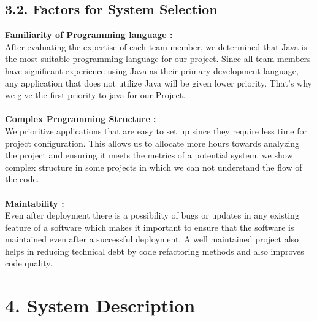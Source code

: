 \documentclass[12pt,letterpaper]{report}
\begin{document}
\subsection*{3.2. Factors for System Selection}
\normalsize{\textbf{Familiarity of Programming language :}\\
After evaluating the expertise of each team member, we determined that Java is the most suitable programming language for our project. Since all team members have significant experience using Java as their primary development language, any application that does not utilize Java will be given lower priority. That's why we give the first priority to java for our Project.}\\
\\
\normalsize{\textbf{Complex Programming Structure :}\\
We prioritize applications that are easy to set up since they require less time for project configuration. This allows us to allocate more hours towards analyzing the project and ensuring it meets the metrics of a potential system. we show complex structure in some projects in which we can not understand the flow of the code.}\\
\\
\normalsize{\textbf{Maintability :}\\
Even after deployment there is a possibility of bugs or updates in any existing feature of a software which makes it important to ensure that the software is maintained even after a successful deployment. A well maintained project also helps in reducing technical debt by code refactoring methods and also improves code quality.}\\
\pagebreak

\section*{4. System Description}
\end{document}
